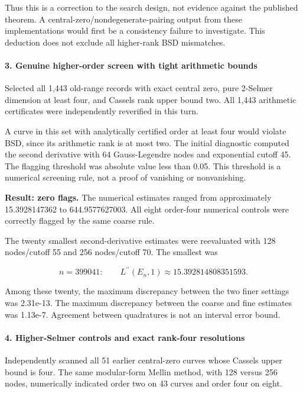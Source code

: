 \documentclass[11pt]{article}
\begin{document}
Thus this is a correction to the search design, not evidence against the published theorem. A central-zero/nondegenerate-pairing output from these implementations would first be a consistency failure to investigate. This deduction does not exclude all higher-rank BSD mismatches.

\paragraph{3. Genuine higher-order screen with tight arithmetic bounds}

Selected all 1,443 old-range records with exact central zero, pure 2-Selmer dimension at least four, and Cassels rank upper bound two. All 1,443 arithmetic certificates were independently reverified in this turn.

A curve in this set with analytically certified order at least four would violate BSD, since its arithmetic rank is at most two. The initial diagnostic computed the second derivative with 64 Gauss-Legendre nodes and exponential cutoff 45. The flagging threshold was absolute value less than 0.05. This threshold is a numerical screening rule, not a proof of vanishing or nonvanishing.

\textbf{Result: zero flags.} The numerical estimates ranged from approximately 15.3928147362 to 644.9577627003. All eight order-four numerical controls were correctly flagged by the same coarse rule.

The twenty smallest second-derivative estimates were reevaluated with 128 nodes/cutoff 55 and 256 nodes/cutoff 70. The smallest was

\[n=399041:\qquad L^{\prime\prime}(E_n,1)\approx15.392814808351593.\]

Among these twenty, the maximum discrepancy between the two finer settings was 2.31e-13. The maximum discrepancy between the coarse and fine estimates was 1.13e-7. Agreement between quadratures is not an interval error bound.

\paragraph{4. Higher-Selmer controls and exact rank-four resolutions}

Independently scanned all 51 earlier central-zero curves whose Cassels upper bound is four. The same modular-form Mellin method, with 128 versus 256 nodes, numerically indicated order two on 43 curves and order four on eight.
\end{document}
